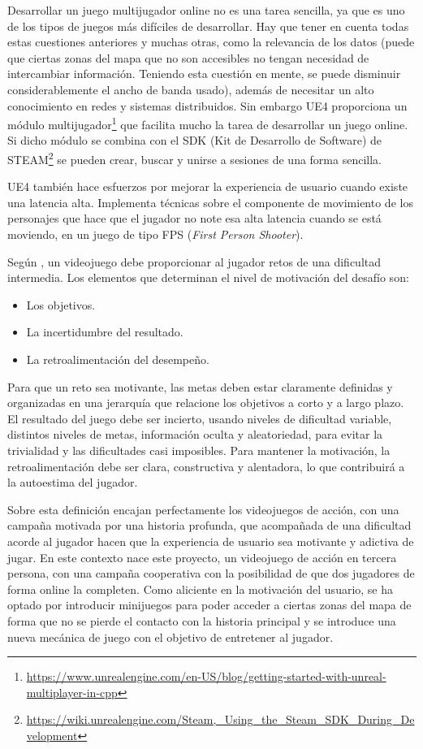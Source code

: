Desarrollar un juego multijugador online no es una tarea sencilla, ya que es uno de los tipos de juegos más difíciles de desarrollar. Hay que tener en cuenta todas estas cuestiones anteriores y muchas otras, como la relevancia de los datos (puede que ciertas zonas del mapa que no son accesibles no tengan necesidad de intercambiar información. Teniendo esta cuestión en mente, se puede disminuir considerablemente el ancho de banda usado), además de necesitar un alto conocimiento en redes y sistemas distribuidos. Sin embargo UE4 proporciona un módulo multijugador\footnote{\url{https://www.unrealengine.com/en-US/blog/getting-started-with-unreal-multiplayer-in-cpp}} que facilita mucho la tarea de desarrollar un juego online. Si dicho módulo se combina con el SDK (Kit de Desarrollo de Software) de STEAM\footnote{\url{https://wiki.unrealengine.com/Steam,_Using_the_Steam_SDK_During_Development}} se pueden crear, buscar y unirse a sesiones de una forma sencilla.

UE4 también hace esfuerzos por mejorar la experiencia de usuario cuando existe una latencia alta. Implementa técnicas sobre el componente de movimiento de los personajes que hace que el jugador no note esa alta latencia cuando se está moviendo, en un juego de tipo FPS (\textit{First Person Shooter}).

Según \cite{10}, un videojuego debe proporcionar al jugador retos de una dificultad intermedia. Los elementos que determinan el nivel de motivación del desafío son:

\newpage

\begin{itemize}
\item Los objetivos.
\item La incertidumbre del resultado.
\item La retroalimentación del desempeño.
\end{itemize}

Para que un reto sea motivante, las metas deben estar claramente definidas y organizadas en una jerarquía que relacione los objetivos a corto y a largo plazo. El resultado del juego debe ser incierto, usando niveles de dificultad variable, distintos niveles de metas, información oculta y aleatoriedad, para evitar la trivialidad y las dificultades casi imposibles. Para mantener la motivación, la retroalimentación debe ser clara, constructiva y alentadora, lo que contribuirá a la autoestima del jugador.

Sobre esta definición encajan perfectamente los videojuegos de acción, con una campaña motivada por una historia profunda, que acompañada de una dificultad acorde al jugador hacen que la experiencia de usuario sea motivante y adictiva de jugar. En este contexto nace este proyecto, un videojuego de acción en tercera persona, con una campaña cooperativa con la posibilidad de que dos jugadores de forma online la completen. Como aliciente en la motivación del usuario, se ha optado por introducir minijuegos para poder acceder a ciertas zonas del mapa de forma que no se pierde el contacto con la historia principal y se introduce una nueva mecánica de juego con el objetivo de entretener al jugador. 

